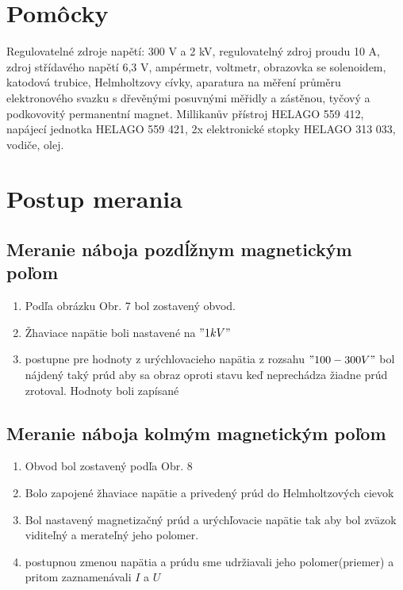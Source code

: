 \documentclass[10pt]{scrartcl}
\begin{document}
\MakeFJFIHead{}






\section{Pomôcky}
Regulovatelné zdroje napětí: 300 V a 2 kV, regulovatelný zdroj proudu 10 A, zdroj
střídavého napětí 6,3 V, ampérmetr, voltmetr, obrazovka se solenoidem, katodová trubice, Helmholtzovy
cívky, aparatura na měření průměru elektronového svazku s dřevěnými posuvnými
měřidly a zástěnou, tyčový a podkovovitý permanentní magnet.
Millikanův přístroj HELAGO 559 412, napájecí jednotka HELAGO 559 421, 2x
elektronické stopky HELAGO 313 033, vodiče, olej.


\section{Postup merania}

\subsection{Meranie náboja pozdĺžnym magnetickým poľom}

\begin{enumerate}
\item Podľa obrázku Obr. 7 \cite{C_1} bol zostavený obvod.
\item Žhaviace napätie boli nastavené na $"1 kV"$
\item postupne pre hodnoty z urýchlovacieho napätia z rozsahu $"100-300 V"$ bol nájdený taký prúd aby sa obraz oproti stavu keď neprechádza žiadne prúd zrotoval. Hodnoty boli zapísané
\end{enumerate}

\subsection{Meranie náboja kolmým magnetickým poľom}
\begin{enumerate}
\item Obvod bol zostavený podľa Obr. 8 \cite{C_1}
\item Bolo zapojené žhaviace napätie a privedený prúd do Helmholtzových cievok
\item Bol nastavený magnetizačný prúd a urýchľovacie napätie tak aby bol zväzok viditeľný a merateľný jeho polomer.
\item postupnou zmenou napätia a prúdu sme udržiavali jeho polomer(priemer) a pritom zaznamenávali $I$ a $U$
\end{enumerate}
\end{document}
